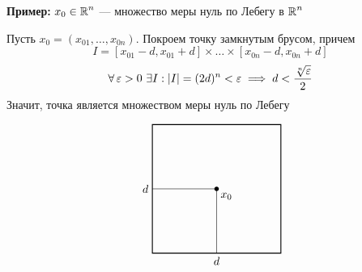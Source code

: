 \documentclass[a4paper, 10pt]{article}
\begin{document}
\textbf{Пример:} $x_0\in\operatorname{\mathbb{R}}^n$ — множество меры нуль по Лебегу в $\operatorname{\mathbb{R}}^n$

\begin{minipage}{0.5\textwidth}
    \proof Пусть $x_0 = (x_{01}, \ldots, x_{0n})$.
    Покроем точку замкнутым брусом, причем $$I = [x_{01}-d, x_{01}+d] \times\ldots\times[x_{0n}-d, x_{0n}+d]$$
    $$\forall \ve > 0\,\,\exists I: |I| = (2d)^n<\ve \implies d < \frac{\sqrt[n]{\ve}}{2}$$
Значит, точка является множеством меры нуль по Лебегу
\end{minipage}
\begin{minipage}{0.5\textwidth}
    $$
\begin{tikzpicture}[scale=2]
    \draw[thick] (0,0) rectangle (2,2);
    \draw[black, thin] (0,1)node[black, left] {$d$} -- (1, 1);
    \draw[black, thin] (1, 0) node[black, below] {$d$} -- (1, 1);

    \fill (1,1) node[black, below right] {$x_0$} circle (1pt); %
\end{tikzpicture}
$$
\end{minipage}
\end{document}
